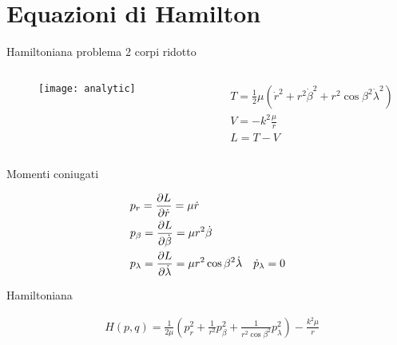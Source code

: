 \section{Equazioni di Hamilton}

\begin{frame}{Hamiltoniana problema 2 corpi ridotto}

\begin{columns}

\begin{column}{0.2\textwidth}

\begin{figure}[!ht]

\texttt{[image: analytic]}

\end{figure}


\end{column}

\begin{column}{0.8\textwidth}

\begin{align*}
&T=\frac{1}{2}\mu(\dot{r}^2+r^2\dot{\beta}^2+r^2\cos{\beta}^2\dot{\lambda}^2)\\
&V=-k^2\frac{\mu}{r}\\
&L=T-V
\end{align*}

\end{column}

\end{columns}

\begin{block}{Momenti coniugati}

\begin{align*}
&p_r=\PDy{\dot{r}}{L}=\mu\dot{r}\\
&p_{\beta}=\PDy{\dot{\beta}}{L}=\mu r^2\dot{\beta}\\
&p_{\lambda}=\PDy{\dot{\lambda}}{L}=\mu r^2\cos{\beta}^2\dot{\lambda}\quad \dot{p}_{\lambda}=0
\end{align*}

\end{block}

\begin{block}{Hamiltoniana}

\begin{align*}
&H(p,q)=\frac{1}{2\mu}(p_r^2+\frac{1}{r^2}p_{\beta}^2+\frac{1}{r^2\cos{\beta}^2}p_{\lambda}^2)-\frac{k^2\mu}{r}
\end{align*}


\end{block}

\end{frame}

